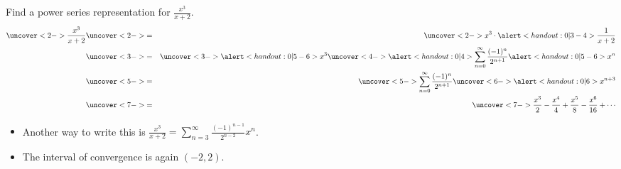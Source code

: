 \begin{frame}
\begin{example}[Example 3, p. 765]
Find a power series representation for $\frac{x^3}{x+2}$.
\abovedisplayskip=0pt
\belowdisplayskip=0pt
\begin{eqnarray*}
\uncover<2->{%
\frac{x^3}{x+2}%
}%
 & \uncover<2->{ = } &%
\uncover<2->{%
x^3 \cdot \alert<handout:0| 3-4>{\frac{1}{x+2}}%
}\\%
& \uncover<3->{ = } &%
\uncover<3->{%
\alert<handout:0| 5-6>{x^3} \uncover<4->{\alert<handout:0| 4>{\sum_{n=0}^\infty \frac{(-1)^n}{2^{n+1}}\alert<handout:0| 5-6>{x^n}}}%
}\\%
 & \uncover<5->{ = } &%
\uncover<5->{%
\sum_{n=0}^\infty \frac{(-1)^n}{2^{n+1}} \uncover<6->{\alert<handout:0| 6>{x^{n+3}}}%
}\\%
 & \uncover<7->{ = } &%
\uncover<7->{%
\frac{x^3}{2} - \frac{x^4}{4} + \frac{x^5}{8} - \frac{x^6}{16} + \cdots%
}%
\end{eqnarray*}
\begin{itemize}
\item<8->  Another way to write this is $\frac{x^3}{x+2} = \sum_{n=3}^\infty \frac{(-1)^{n-1}}{2^{n-2}}x^n$.
\item<9->  The interval of convergence is again $(-2, 2)$.
\end{itemize}
\end{example}
\end{frame}

